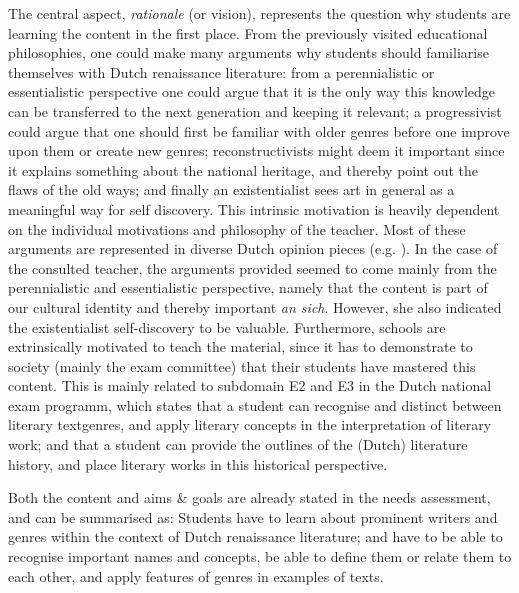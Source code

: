 The central aspect, \emph{rationale} (or vision), represents the question why students are learning the content in the first place. From the previously visited educational philosophies, one could make many arguments why students should familiarise themselves with Dutch renaissance literature: from a perennialistic or essentialistic perspective one could argue that it is the only way this knowledge can be transferred to the next generation and keeping it relevant; a progressivist could argue that one should first be familiar with older genres before one improve upon them or create new genres; reconstructivists might deem it important since it explains something about the national heritage, and thereby point out the flaws of the old ways; and finally an existentialist sees art in general as a meaningful way for self discovery. This intrinsic motivation is heavily dependent on the individual motivations and philosophy of the teacher. Most of these arguments are represented in diverse Dutch opinion pieces (e.g. ). In the case of the consulted teacher, the arguments provided seemed to come mainly from the perennialistic and essentialistic perspective, namely that the content is part of our cultural identity and thereby important \emph{an sich}. However, she also indicated the existentialist self-discovery to be valuable. Furthermore, schools are extrinsically motivated to teach the material, since it has to demonstrate to society (mainly the exam committee) that their students have mastered this content. This is mainly related to subdomain E2 and E3 in the Dutch national exam programm, which states that a student can recognise and distinct between literary textgenres, and apply literary concepts in the interpretation of literary work; and that a student can provide the outlines of the (Dutch) literature history, and place literary works in this historical perspective.

Both the content and aims \& goals are already stated in the needs assessment, and can be summarised as: Students have to learn about prominent writers and genres within the context of Dutch renaissance literature; and have to be able to recognise important names and concepts, be able to define them or relate them to each other, and apply features of genres in examples of texts.

